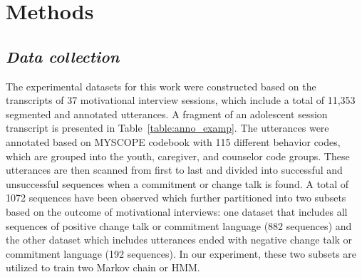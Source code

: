 \documentclass{amia}
\begin{document}
\section*{Methods}
\subsection*{\textit{Data collection}}
The experimental datasets for this work were constructed based on the transcripts of 37 motivational interview sessions, which include a total of 11,353 segmented and annotated utterances. A fragment of an adolescent session transcript is presented in Table~\ref{table:anno_examp}. The utterances were annotated based on MYSCOPE codebook \cite{carcone2013provider} with 115 different behavior codes, which are grouped into the youth, caregiver, and counselor code groups. These utterances are then scanned from first to last and divided into successful and unsuccessful sequences when a commitment or change talk is found. A total of 1072 sequences have been observed which further partitioned into two subsets based on the outcome of motivational interviews: one dataset that includes all sequences of positive change talk or commitment language (882 sequences) and the other dataset which includes utterances ended with negative change talk or commitment language (192 sequences). In our experiment, these two subsets are utilized to train two Markov chain or HMM.
\end{document}
